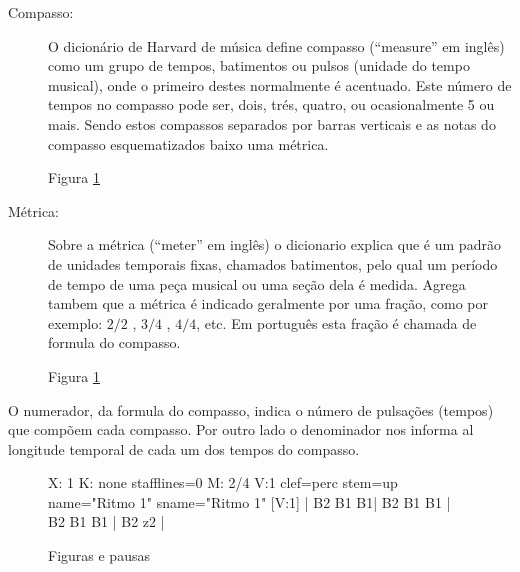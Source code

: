 \begin{description}
\item[Compasso:] O dicionário de Harvard de música \cite[pp. 513]{apel1969harvard} define compasso (``measure'' em inglês)
como um grupo de tempos, batimentos ou pulsos (unidade do tempo musical),
onde o primeiro destes normalmente é acentuado. 
Este número de tempos no compasso pode ser, dois, trés, quatro, ou ocasionalmente 5 ou mais. 
Sendo estos compassos separados por barras verticais e as notas do compasso esquematizados baixo uma métrica.
\begin{example}
Figura \ref{fig:abc-exemplocompasso1}
\end{example}
 
\item[Métrica:] Sobre a métrica  (``meter'' em inglês) o dicionario \cite[pp. 523]{apel1969harvard} explica que é
um padrão de unidades temporais fixas, chamados batimentos, 
pelo qual um período de tempo de uma peça musical ou uma seção dela é medida. 
Agrega tambem que a métrica é indicado geralmente por uma fração, como por exemplo:
${2}/{2}$ , ${3}/{4}$ , ${4}/{4}$, etc. Em português esta fração é chamada de formula do compasso. 
\begin{example}
Figura \ref{fig:abc-exemplocompasso1}
\end{example}
\end{description}

O numerador, da formula do compasso, indica o número de pulsações (tempos) que compõem cada compasso.
Por outro lado o denominador nos informa al longitude temporal de cada um dos tempos do compasso.

\begin{figure}[h]
\centering
\begin{abc}[name=abc-exemplocompasso1]
%
X: 1 %
K: none stafflines=0 %
M: 2/4
V:1 clef=perc stem=up name="Ritmo 1"   sname="Ritmo 1"
%
[V:1] | B2 B1 B1| B2 B1 B1 | B2 B1 B1 | B2 z2  |
%       
\end{abc}
\caption{Figuras e pausas}
\label{fig:abc-exemplocompasso1}
\end{figure}



